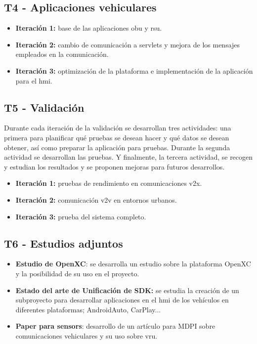 \subsection{T4 - Aplicaciones vehiculares}
\begin{itemize}
	\item \textbf{Iteración 1:} base de las aplicaciones \gls{obu} y \gls{rsu}.
	\item \textbf{Iteración 2:} cambio de comunicación a servlets y mejora de los mensajes empleados en la comunicación.
	\item \textbf{Iteración 3:} optimización de la plataforma e implementación de la aplicación para el \gls{hmi}.
\end{itemize}

\subsection{T5 - Validación}
Durante cada iteración de la validación se desarrollan tres actividades: una primera para planificar qué pruebas se desean hacer y qué datos se desean obtener, así como preparar la aplicación para pruebas. Durante la segunda actividad se desarrollan las pruebas. Y finalmente, la tercera actividad, se recogen y estudian los resultados y se proponen mejoras para futuros desarrollos.
\begin{itemize}
	\item \textbf{Iteración 1:} pruebas de rendimiento en comunicaciones \gls{v2x}.
	\item \textbf{Iteración 2:} comunicación \gls{v2v} en entornos urbanos.
	\item \textbf{Iteración 3:} prueba del sistema completo.
\end{itemize}

\subsection{T6 - Estudios adjuntos}
\begin{itemize}
	\item \textbf{Estudio de OpenXC}: se desarrolla un estudio sobre la plataforma OpenXC y la posibilidad de su uso en el proyecto.
	\item \textbf{Estado del arte de Unificación de SDK:} se estudia la creación de un subproyecto para desarrollar aplicaciones en el \gls{hmi} de los vehículos en diferentes plataformas; AndroidAuto, CarPlay...
	\item \textbf{Paper para sensors}: desarrollo de un artículo para MDPI sobre comunicaciones vehiculares y su uso sobre \gls{vru}.
\end{itemize}

